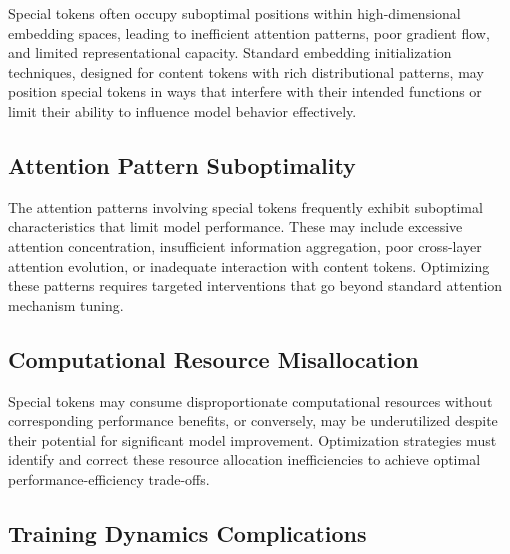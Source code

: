 Special tokens often occupy suboptimal positions within high-dimensional embedding spaces, leading to inefficient attention patterns, poor gradient flow, and limited representational capacity. Standard embedding initialization techniques, designed for content tokens with rich distributional patterns, may position special tokens in ways that interfere with their intended functions or limit their ability to influence model behavior effectively.
\begin{comment}
Feedback: A concrete example would make this much clearer. For instance: "For example, a randomly initialized [CLS] token might start in a 'remote' part of the embedding space, far from the content tokens it needs to aggregate. This forces the model to waste significant training time just learning to move the [CLS] token to a more central, effective location. Optimization techniques can place it in a better starting position, accelerating learning."
\end{comment}

\subsection{Attention Pattern Suboptimality}

The attention patterns involving special tokens frequently exhibit suboptimal characteristics that limit model performance. These may include excessive attention concentration, insufficient information aggregation, poor cross-layer attention evolution, or inadequate interaction with content tokens. Optimizing these patterns requires targeted interventions that go beyond standard attention mechanism tuning.

\subsection{Computational Resource Misallocation}

Special tokens may consume disproportionate computational resources without corresponding performance benefits, or conversely, may be underutilized despite their potential for significant model improvement. Optimization strategies must identify and correct these resource allocation inefficiencies to achieve optimal performance-efficiency trade-offs.

\subsection{Training Dynamics Complications}

